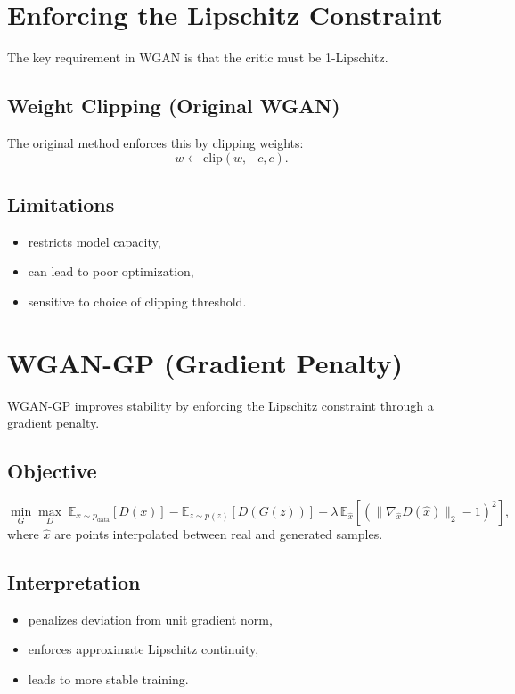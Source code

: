 \section{Enforcing the Lipschitz Constraint}

The key requirement in WGAN is that the critic must be 1-Lipschitz.

\subsection{Weight Clipping (Original WGAN)}

The original method enforces this by clipping weights:
\[
w \leftarrow \mathrm{clip}(w, -c, c).
\]

\subsection{Limitations}

\begin{itemize}
    \item restricts model capacity,
    \item can lead to poor optimization,
    \item sensitive to choice of clipping threshold.
\end{itemize}

\section{WGAN-GP (Gradient Penalty)}

WGAN-GP improves stability by enforcing the Lipschitz constraint through a gradient penalty.

\subsection{Objective}

\[
\min_G \max_D
\;
\mathbb{E}_{x \sim p_{\text{data}}}[D(x)]
-
\mathbb{E}_{z \sim p(z)}[D(G(z))]
+
\lambda \, \mathbb{E}_{\hat{x}}
\left[
\left(\|\nabla_{\hat{x}} D(\hat{x})\|_2 - 1\right)^2
\right],
\]
where $\hat{x}$ are points interpolated between real and generated samples.

\subsection{Interpretation}

\begin{itemize}
    \item penalizes deviation from unit gradient norm,
    \item enforces approximate Lipschitz continuity,
    \item leads to more stable training.
\end{itemize}

